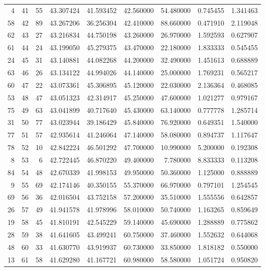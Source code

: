 \begin{tabular}{rrrrrrrrr}
4 & 41 & 55 & 43.307424 & 41.593452 & 42.560000 & 54.480000 & 0.745455 & 1.341463 \\
58 & 42 & 89 & 43.267206 & 36.256304 & 42.410000 & 88.660000 & 0.471910 & 2.119048 \\
62 & 43 & 27 & 43.216834 & 44.750198 & 43.260000 & 26.970000 & 1.592593 & 0.627907 \\
61 & 44 & 24 & 43.199050 & 45.279375 & 43.470000 & 22.180000 & 1.833333 & 0.545455 \\
24 & 45 & 31 & 43.140881 & 44.082268 & 44.200000 & 32.490000 & 1.451613 & 0.688889 \\
63 & 46 & 26 & 43.134122 & 44.994026 & 44.140000 & 25.000000 & 1.769231 & 0.565217 \\
60 & 47 & 22 & 43.073361 & 45.306895 & 45.120000 & 22.030000 & 2.136364 & 0.468085 \\
53 & 48 & 47 & 43.051323 & 42.314917 & 45.250000 & 47.600000 & 1.021277 & 0.979167 \\
75 & 49 & 63 & 43.041899 & 40.717640 & 45.430000 & 63.140000 & 0.777778 & 1.285714 \\
31 & 50 & 77 & 43.023944 & 39.186429 & 45.840000 & 76.920000 & 0.649351 & 1.540000 \\
77 & 51 & 57 & 42.935614 & 41.246064 & 47.140000 & 58.080000 & 0.894737 & 1.117647 \\
78 & 52 & 10 & 42.842224 & 46.501292 & 47.700000 & 10.990000 & 5.200000 & 0.192308 \\
8 & 53 & 6 & 42.722445 & 46.870220 & 49.400000 & 7.780000 & 8.833333 & 0.113208 \\
84 & 54 & 48 & 42.670339 & 41.998153 & 49.950000 & 50.360000 & 1.125000 & 0.888889 \\
9 & 55 & 69 & 42.174146 & 40.350155 & 55.370000 & 66.970000 & 0.797101 & 1.254545 \\
69 & 56 & 36 & 42.016504 & 43.752158 & 57.200000 & 35.510000 & 1.555556 & 0.642857 \\
26 & 57 & 49 & 41.941578 & 41.978996 & 58.010000 & 50.740000 & 1.163265 & 0.859649 \\
19 & 58 & 45 & 41.810191 & 42.545229 & 59.140000 & 45.690000 & 1.288889 & 0.775862 \\
28 & 59 & 38 & 41.641605 & 43.499241 & 60.750000 & 37.460000 & 1.552632 & 0.644068 \\
48 & 60 & 33 & 41.630770 & 43.919937 & 60.730000 & 33.850000 & 1.818182 & 0.550000 \\
13 & 61 & 58 & 41.629280 & 41.167721 & 60.980000 & 58.580000 & 1.051724 & 0.950820 \\

\end{tabular}
